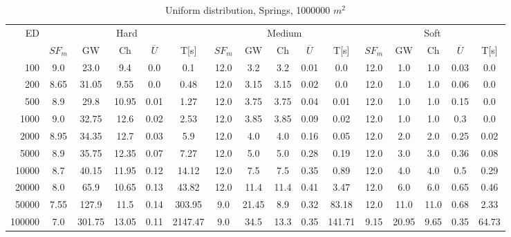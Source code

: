 \begin{table}[htb]
	\centering
	\begin{tabular}{|r|c|c|c|c|c|c|c|c|c|c|c|c|c|c|c|} 
		\hline
		\multirow{2}{*}{ED} & \multicolumn{5}{c|}{Hard} & \multicolumn{5}{c|}{Medium} &\multicolumn{5}{c|}{Soft} \\ 
		\cline{2-16} 
		&$SF_{m}$&GW & Ch & $\overline{U}$&T[s] &$SF_{m}$&GW & Ch & $\overline{U}$ &T[s] &$SF_{m}$&GW & Ch & $\overline{U}$  & T[s]  \\ 
		\hline 
		100 & 9.0 & 23.0 & 9.4 & 0.0 & 0.1 & 12.0 & 3.2 & 3.2 & 0.01 & 0.0 & 12.0 & 1.0 & 1.0 & 0.03 & 0.0\\ 
		200 & 8.65 & 31.05 & 9.55 & 0.0 & 0.48 & 12.0 & 3.15 & 3.15 & 0.02 & 0.0 & 12.0 & 1.0 & 1.0 & 0.06 & 0.0\\ 
		500 & 8.9 & 29.8 & 10.95 & 0.01 & 1.27 & 12.0 & 3.75 & 3.75 & 0.04 & 0.01 & 12.0 & 1.0 & 1.0 & 0.15 & 0.0\\ 
		1000 & 9.0 & 32.75 & 12.6 & 0.02 & 2.53 & 12.0 & 3.85 & 3.85 & 0.09 & 0.02 & 12.0 & 1.0 & 1.0 & 0.3 & 0.0\\ 
		2000 & 8.95 & 34.35 & 12.7 & 0.03 & 5.9 & 12.0 & 4.0 & 4.0 & 0.16 & 0.05 & 12.0 & 2.0 & 2.0 & 0.25 & 0.02\\ 
		5000 & 8.9 & 35.75 & 12.35 & 0.07 & 7.27 & 12.0 & 5.0 & 5.0 & 0.28 & 0.19 & 12.0 & 3.0 & 3.0 & 0.36 & 0.08\\ 
		10000 & 8.7 & 40.15 & 11.95 & 0.12 & 14.12 & 12.0 & 7.5 & 7.5 & 0.35 & 0.89 & 12.0 & 4.0 & 4.0 & 0.5 & 0.29\\ 
		20000 & 8.0 & 65.9 & 10.65 & 0.13 & 43.82 & 12.0 & 11.4 & 11.4 & 0.41 & 3.47 & 12.0 & 6.0 & 6.0 & 0.65 & 0.46\\ 
		50000 & 7.55 & 127.9 & 11.5 & 0.14 & 303.95 & 9.0 & 21.45 & 8.9 & 0.32 & 83.18 & 12.0 & 11.0 & 11.0 & 0.68 & 2.33\\ 
		100000 & 7.0 & 301.75 & 13.05 & 0.11 & 2147.47 & 9.0 & 34.5 & 13.3 & 0.35 & 141.71 & 9.15 & 20.95 & 9.65 & 0.35 & 64.73\\ 
		\hline 
	\end{tabular} 
	\caption{Uniform distribution, Springs, 1000000 $m^2$} 
	\label{tab:UnSprings1000} 
\end{table} 
